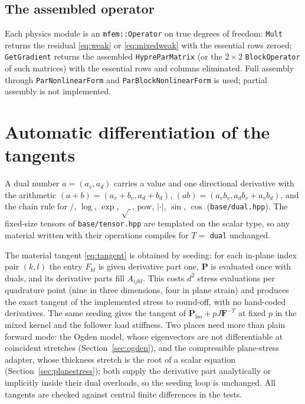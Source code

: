 \documentclass[11pt]{article}
\newcommand{\bP}{\bm{P}}
\newcommand{\bF}{\bm{F}}
\DeclareRobustCommand{\code}[1]{{\def\_{\textunderscore\allowbreak}\texttt{#1}}}
\DeclareRobustCommand{\file}[1]{{\def\_{\textunderscore\allowbreak}\texttt{#1}}}
\begin{document}
\subsection{The assembled operator}

Each physics module is an \code{mfem::Operator} on true degrees of
freedom: \code{Mult} returns the residual \eqref{eq:weak} or
\eqref{eq:mixedweak} with the essential rows zeroed;
\code{GetGradient} returns the assembled \code{HypreParMatrix} (or the
$2\times2$ \code{BlockOperator} of such matrices) with the essential rows
and columns eliminated.  Full assembly through
\code{ParNonlinearForm} and \code{ParBlockNonlinearForm} is used; partial
assembly is not implemented.

\section{Automatic differentiation of the tangents}
\label{sec:ad}

A dual number $a = (a_v, a_d)$ carries a value and one directional
derivative with the arithmetic $(a + b) = (a_v + b_v, a_d + b_d)$,
$(ab) = (a_vb_v, a_db_v + a_vb_d)$, and the chain rule for $/$, $\log$,
$\exp$, $\sqrt{\ }$, $\mathrm{pow}$, $|\cdot|$, $\sin$, $\cos$
(\file{base/dual.hpp}).  The fixed-size tensors of \file{base/tensor.hpp}
are templated on the scalar type, so any material written with their
operations compiles for $T = $ \code{dual} unchanged.

The material tangent \eqref{eq:tangent} is obtained by seeding: for each
in-plane index pair $(k, l)$ the entry $F_{kl}$ is given derivative part
one, $\bP$ is evaluated once with duals, and its derivative parts fill
$A_{ijkl}$.  This costs $d^2$ stress evaluations per quadrature point (nine
in three dimensions, four in plane strain) and produces the exact tangent
of the implemented stress to round-off, with no hand-coded derivatives.
The same seeding gives the tangent of $\bP_{\mathrm{iso}} + pJ\bF^{-T}$ at
fixed $p$ in the mixed kernel and the follower load stiffness.  Two places
need more than plain forward mode: the Ogden model, whose eigenvectors are
not differentiable at coincident stretches (Section~\ref{sec:ogden}), and
the compressible plane-stress adapter, whose thickness stretch is the root
of a scalar equation (Section~\ref{sec:planestress}); both supply the
derivative part analytically or implicitly inside their dual overloads,
so the seeding loop is unchanged.  All tangents are checked against central
finite differences in the tests.
\end{document}

